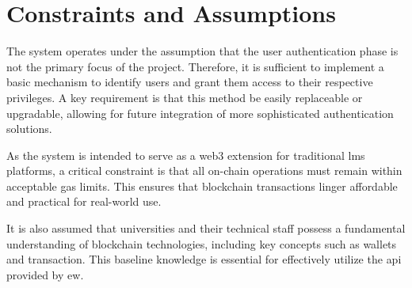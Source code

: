 \section{Constraints and Assumptions}
The system operates under the assumption that the user authentication phase is not the primary focus of the project. Therefore, it is sufficient to implement a basic mechanism to identify users and grant them access to their respective privileges. A key requirement is that this method be easily replaceable or upgradable, allowing for future integration of more sophisticated authentication solutions.

As the system is intended to serve as a \Gls{web3} extension for traditional \acrshort{lms} platforms, a critical constraint is that all on-chain operations must remain within acceptable gas limits. This ensures that blockchain transactions linger affordable and practical for real-world use. 

It is also assumed that universities and their technical staff possess a fundamental understanding of blockchain technologies, including key concepts such as wallets and transaction. This baseline knowledge is essential for effectively utilize the \acrshort{api} provided by \acrshort{ew}.
